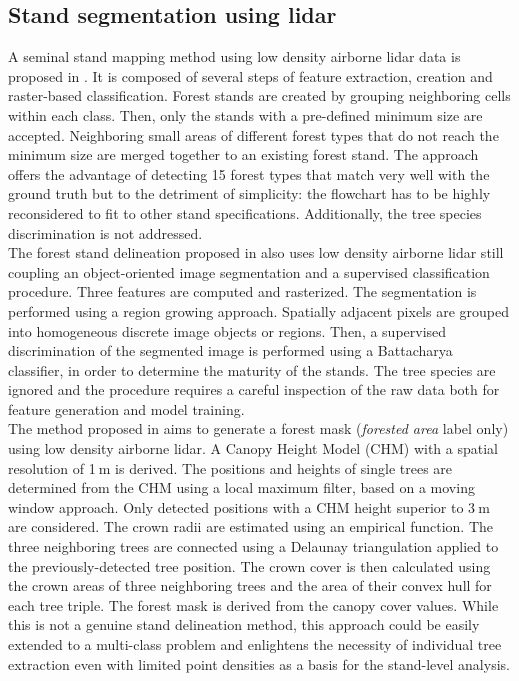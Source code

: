 \subsection{Stand segmentation using lidar}
A seminal stand mapping method using low density airborne lidar data is proposed in \citep{koch2009airborne}. It is composed of several steps of feature extraction, creation and raster-based classification. Forest stands are created by grouping neighboring cells within each class. Then, only the stands with a pre-defined minimum size are accepted. Neighboring small areas of different forest types that do not reach the minimum size are merged together to an existing forest stand. The approach offers the advantage of detecting 15 forest types that match very well with the ground truth but to the detriment of simplicity: the flowchart has to be highly reconsidered to fit to other stand specifications. Additionally, the tree species discrimination is not addressed.\\
The forest stand delineation proposed in \citep{sullivan2009object} also uses low density airborne lidar still coupling an object-oriented image segmentation and a supervised classification procedure. Three features are computed and rasterized. The segmentation is performed using a region growing approach. Spatially adjacent pixels are grouped into homogeneous discrete image objects or regions. Then, a supervised discrimination of the segmented image is performed using a Battacharya classifier, in order to determine the maturity of the stands. The tree species are ignored and the procedure requires a careful inspection of the raw data both for feature generation and model training. \\
The method proposed in \citep{eysn2012forest} aims to generate a forest mask (\textit{forested area} label only) using low density airborne lidar. A Canopy Height Model (CHM) with a spatial resolution of 1$\:$m is derived. The positions and heights of single trees are determined from the CHM using a local maximum filter, based on a moving window approach. Only detected positions with a CHM height superior to 3$\:$m are considered. The crown radii are estimated using an empirical function. The three neighboring trees are connected using a Delaunay triangulation applied to the previously-detected tree position. The crown cover is then calculated using the crown areas of three neighboring trees and the area of their convex hull for each tree triple. The forest mask is derived from the canopy cover values. While this is not a genuine stand delineation method, this approach could be easily extended to a multi-class problem and enlightens the necessity of individual tree extraction even with limited point densities as a basis for the stand-level analysis.\\
